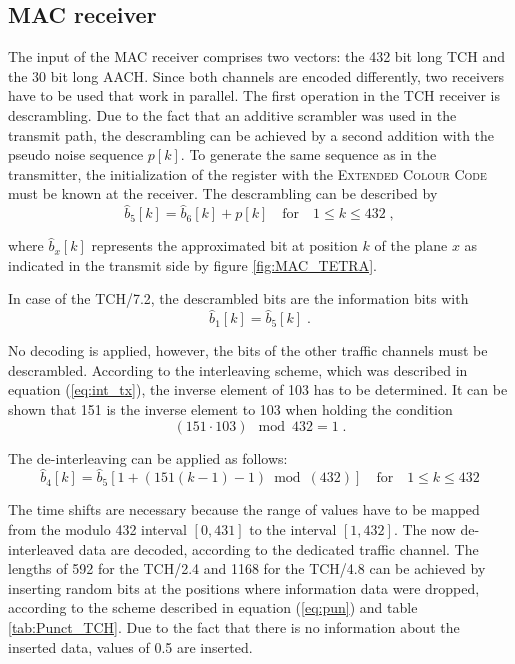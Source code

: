 \subsection{MAC receiver}
The input of the MAC receiver comprises two vectors: the 432 bit long \ac{TCH} and the 30 bit long \ac{AACH}. Since both channels are encoded differently, two receivers have to be used that work in parallel. The first operation in the \ac{TCH} receiver is descrambling. Due to the fact that an additive scrambler was used in the transmit path, the descrambling can be achieved by a second addition with the pseudo noise sequence $p[k]$. To generate the same sequence as in the transmitter, the initialization of the register with the \textsc{Extended Colour Code} must be known at the receiver. The descrambling can be described by
\begin{equation}
\hat{b}_5[k] = \hat{b}_6[k] + p[k] \quad \text{for} \quad 1 \leq k \leq 432\;,
\end{equation}

where $\hat{b}_x[k]$ represents the approximated bit at position $k$ of the plane $x$ as indicated in the transmit side by figure \ref{fig:MAC_TETRA}.

In case of the TCH/7.2, the descrambled bits are the information bits with
\begin{equation}
\hat{b}_1[k] = \hat{b}_5[k]\;.
\end{equation}

No decoding is applied, however, the bits of the other traffic channels must be descrambled. According to the interleaving scheme, which was described in equation (\ref{eq:int_tx}), the inverse element of 103 has to be determined. It can be shown that 151 is the inverse element to 103 when holding the condition
\begin{equation}
(151 \cdot 103) \mod 432  = 1\;.
\end{equation}

The de-interleaving can be applied as follows:
\begin{equation}
\hat{b}_4[k] = \hat{b}_5\left[ 1+ \left( 151 \left(k-1\right)-1\right) \bmod (432)  \right] \quad \text{for} \quad 1 \leq k \leq 432
\label{eq:deint}
\end{equation} 

The time shifts are necessary because the range of values have to be mapped from the modulo 432 interval $[0,431]$ to the interval $[1,432]$. The now de-interleaved data are decoded, according to the dedicated traffic channel. The lengths of 592 for the TCH/2.4 and 1168 for the TCH/4.8 can be achieved by inserting random bits at the positions where information data were dropped, according to the scheme described in equation (\ref{eq:pun}) and table \ref{tab:Punct_TCH}. Due to the fact that there is no information about the inserted data, values of 0.5 are inserted.


